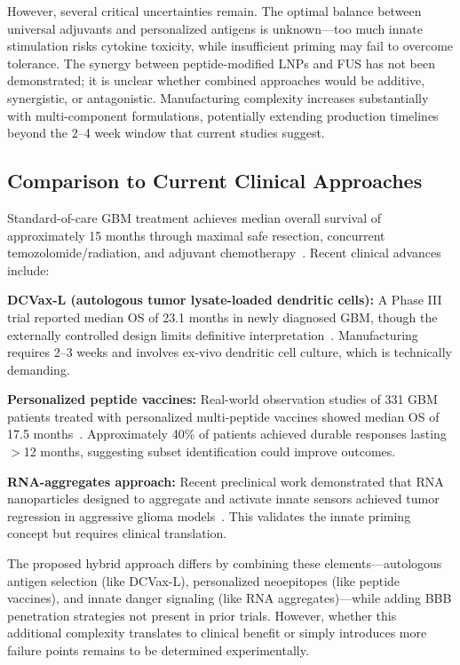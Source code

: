 \documentclass[12pt]{article}
\begin{document}
However, several critical uncertainties remain. The optimal balance between universal adjuvants and personalized antigens is unknown—too much innate stimulation risks cytokine toxicity, while insufficient priming may fail to overcome tolerance. The synergy between peptide-modified LNPs and FUS has not been demonstrated; it is unclear whether combined approaches would be additive, synergistic, or antagonistic. Manufacturing complexity increases substantially with multi-component formulations, potentially extending production timelines beyond the 2--4 week window that current studies suggest.

\subsection{Comparison to Current Clinical Approaches}
Standard-of-care GBM treatment achieves median overall survival of approximately 15 months through maximal safe resection, concurrent temozolomide/radiation, and adjuvant chemotherapy~\citep{lim2024}. Recent clinical advances include:

\textbf{DCVax-L (autologous tumor lysate-loaded dendritic cells):} A Phase III trial reported median OS of 23.1 months in newly diagnosed GBM, though the externally controlled design limits definitive interpretation~\citep{liau2023}. Manufacturing requires 2--3 weeks and involves ex-vivo dendritic cell culture, which is technically demanding.

\textbf{Personalized peptide vaccines:} Real-world observation studies of 331 GBM patients treated with personalized multi-peptide vaccines showed median OS of 17.5 months~\citep{hilf2024}. Approximately 40\% of patients achieved durable responses lasting $>$12 months, suggesting subset identification could improve outcomes.

\textbf{RNA-aggregates approach:} Recent preclinical work demonstrated that RNA nanoparticles designed to aggregate and activate innate sensors achieved tumor regression in aggressive glioma models~\citep{sayour2024}. This validates the innate priming concept but requires clinical translation.

The proposed hybrid approach differs by combining these elements—autologous antigen selection (like DCVax-L), personalized neoepitopes (like peptide vaccines), and innate danger signaling (like RNA aggregates)—while adding BBB penetration strategies not present in prior trials. However, whether this additional complexity translates to clinical benefit or simply introduces more failure points remains to be determined experimentally.
\end{document}
